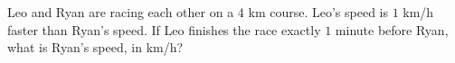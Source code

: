 Leo and Ryan are racing each other on a $4$ km course. Leo's speed is $1$ km/h faster than Ryan's speed. If Leo finishes the race exactly $1$ minute before Ryan, what is Ryan's speed, in km/h?

